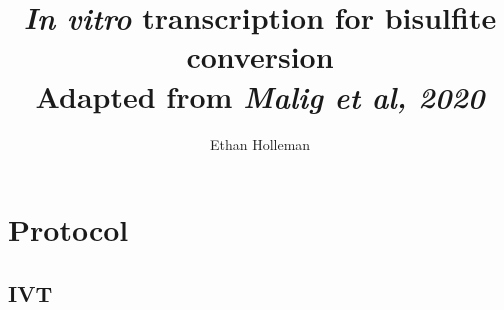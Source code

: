 \documentclass[12pt]{article}
\theoremstyle{definition}
\begin{document}
\title{
	\textbf{\emph{In vitro} transcription for bisulfite conversion}\\
	\large Adapted from \emph{Malig et al, 2020}}

\author{Ethan Holleman}
\maketitle


\section*{Protocol}

\subsection*{IVT}
\end{document}
